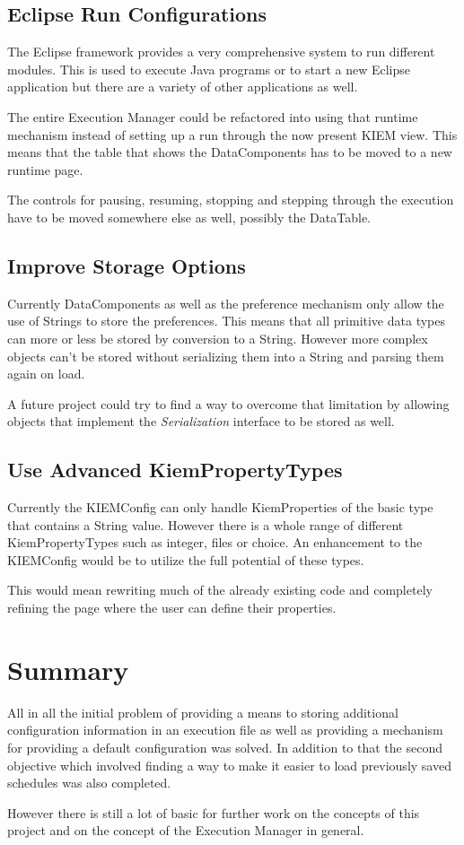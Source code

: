 \subsection{Eclipse Run Configurations}
The Eclipse framework provides a very comprehensive system to run different
modules. This is used to execute Java programs or to start a new Eclipse application
but there are a variety of other applications as well.

The entire Execution Manager could be refactored into using that runtime mechanism instead
of setting up a run through the now present \ac{KIEM} view. This means that the table
that shows the DataComponents has to be moved to a new runtime page. 

The controls for pausing, resuming, stopping and stepping through the execution have to
be moved somewhere else as well, possibly the DataTable.

\subsection{Improve Storage Options}
Currently DataComponents as well as the preference mechanism only allow the use of
Strings to store the preferences. This means that all primitive data types can more
or less be stored by conversion to a String. However more complex objects can't be stored
without serializing them into a String and parsing them again on load.

A future project could try to find a way to overcome that limitation by allowing
objects that implement the \textit{Serialization} interface to be stored as well.

\subsection{Use Advanced KiemPropertyTypes}
Currently the \ac{KIEMConfig} can only handle KiemProperties of the basic type that
contains a String value. However there is a whole range of different KiemPropertyTypes
such as integer, files or choice. An enhancement to the \ac{KIEMConfig} would be to
utilize the full potential of these types.

This would mean rewriting much of the already existing code and completely refining
the page where the user can define their properties.

\section{Summary}
All in all the initial problem of providing a means to storing additional configuration information
in an execution file as well as providing a mechanism for providing a default configuration was solved. 
In addition to that the second objective which involved finding a way to make it easier to load previously
saved schedules was also completed.

However there is still a lot of basic for further work on the concepts of this project and on the
concept of the Execution Manager in general.